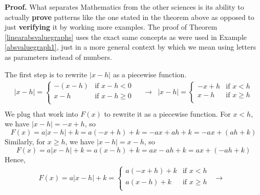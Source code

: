 \documentclass{ximera}
\begin{document}

\bigskip

{\bf Proof.} What separates Mathematics from the other sciences is its ability to actually \textbf{prove} patterns like the one stated in the theorem above as opposed to just \textbf{verifying} it by working more examples.  The proof of Theorem \ref{linearabsvaluegraphs} uses the exact same concepts as were used in Example \ref{absvaluegraph1}, just in a more general context by which we mean using letters as parameters instead of numbers.  

\medskip

The first step is to rewrite $|x - h|$ as a piecewise function.\[ \begin{array}{ccc}

 |x - h|  = \begin{cases} 
      -(x - h) &  \text{if $x - h  < 0$ } \\
     x - h  & \text{if $x - h \geq 0$} \\
   \end{cases}
   
 &
 
 \longrightarrow
 
 &
 
 |x - h|  =   \begin{cases} 
     -x + h &  \text{if $x <  h$} \\
    x - h  & \text{if $x \geq h$} \\
   \end{cases} \\ 
   
   \end{array}  \] We plug that work into $F(x)$ to rewrite it as a piecewise function.  For $x < h$, we have $|x - h| = -x + h$, so \[F(x) = a|x - h| + k = a(-x + h) + k = -ax + ah + k = -ax + (ah + k)\]  Similarly, for $x \geq h$, we have $|x - h| = x - h$, so \[F(x) = a|x - h| + k = a(x - h) + k = ax - ah + k = ax + (-ah + k)\]  Hence, \[ \begin{array}{ccc}

F(x)  =  a|x - h| + k =  \begin{cases} 
     a(-x + h) + k &  \text{if $x < h$} \\
   a(x - h) + k  & \text{if $x \geq h$} \\
   \end{cases} 
   
 &
 
 \longrightarrow
 
 &
 

\end{array}\]
\end{document}
